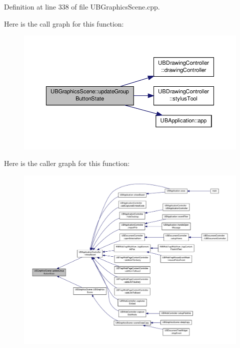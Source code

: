 Definition at line 338 of file U\-B\-Graphics\-Scene.\-cpp.



Here is the call graph for this function\-:
\nopagebreak
\begin{figure}[H]
\begin{center}
\leavevmode
\includegraphics[width=350pt]{dc/db2/class_u_b_graphics_scene_a94a8bb0eb91d5db7904d7bc2932cdc0e_cgraph}
\end{center}
\end{figure}




Here is the caller graph for this function\-:
\nopagebreak
\begin{figure}[H]
\begin{center}
\leavevmode
\includegraphics[width=350pt]{dc/db2/class_u_b_graphics_scene_a94a8bb0eb91d5db7904d7bc2932cdc0e_icgraph}
\end{center}
\end{figure}


